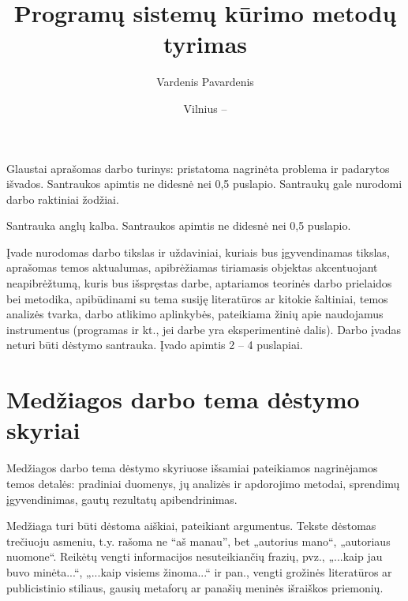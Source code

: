 \documentclass{VUMIFPSbakalaurinis}
\institute{Informatikos institutas}  %
\title{Programų sistemų kūrimo metodų tyrimas}
\author{Vardenis Pavardenis}
\date{Vilnius – \the\year}
\begin{document}
\maketitle


Glaustai aprašomas darbo turinys: pristatoma nagrinėta problema ir padarytos
išvados. Santraukos apimtis ne didesnė nei 0,5 puslapio. Santraukų gale
nurodomi darbo raktiniai žodžiai. 

Santrauka anglų kalba. Santraukos apimtis ne didesnė nei 0,5 puslapio.

\tableofcontents

Įvade nurodomas darbo tikslas ir uždaviniai, kuriais bus įgyvendinamas tikslas,
aprašomas temos aktualumas, apibrėžiamas tiriamasis objektas akcentuojant
neapibrėžtumą, kuris bus išspręstas darbe, aptariamos teorinės darbo prielaidos
bei metodika, apibūdinami su tema susiję literatūros ar kitokie šaltiniai,
temos analizės tvarka, darbo atlikimo aplinkybės, pateikiama žinių apie
naudojamus instrumentus (programas ir kt., jei darbe yra eksperimentinė dalis).
Darbo įvadas neturi būti dėstymo santrauka. Įvado apimtis 2 -- 4 puslapiai.

\section{Medžiagos darbo tema dėstymo skyriai}
Medžiagos darbo tema dėstymo skyriuose išsamiai pateikiamos nagrinėjamos temos
detalės: pradiniai duomenys, jų analizės ir apdorojimo metodai, sprendimų
įgyvendinimas, gautų rezultatų apibendrinimas.

Medžiaga turi būti dėstoma aiškiai, pateikiant argumentus. Tekste dėstomas
trečiuoju asmeniu, t.y. rašoma ne \enquote{aš manau}, bet „autorius mano“, „autoriaus
nuomone“. Reikėtų vengti informacijos nesuteikiančių frazių, pvz., „...kaip jau
buvo minėta...“, „...kaip visiems žinoma...“ ir pan., vengti grožinės
literatūros ar publicistinio stiliaus, gausių metaforų ar panašių meninės
išraiškos priemonių.
\end{document}

